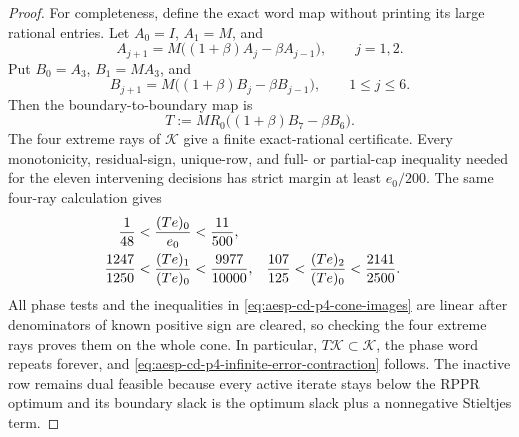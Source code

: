 \begin{proof}
For completeness, define the exact word map without printing its large
rational entries.  Let $A_0=I$, $A_1=M$, and
\begin{equation*}
 A_{j+1}=M\bigl((1+\beta)A_j-\beta A_{j-1}\bigr),
 \qquad j=1,2.
\end{equation*}
Put $B_0=A_3$, $B_1=MA_3$, and
\begin{equation*}
 B_{j+1}=M\bigl((1+\beta)B_j-\beta B_{j-1}\bigr),
 \qquad 1\leq j\leq6.
\end{equation*}
Then the boundary-to-boundary map is
\begin{equation}
 T:=MR_0\bigl((1+\beta)B_7-\beta B_6\bigr).
 \label{eq:aesp-cd-p4-word-map}
\end{equation}
The four extreme rays of $\mathcal K$ give a finite exact-rational
certificate.  Every monotonicity, residual-sign, unique-row, and full- or
partial-cap inequality needed for the eleven intervening decisions has
strict margin at least $e_0/200$.  The same four-ray calculation gives
\begin{align}
 \frac1{48}
 &<\frac{(Te)_0}{e_0}<\frac{11}{500},
 \notag\\
 \frac{1247}{1250}
 &<\frac{(Te)_1}{(Te)_0}<\frac{9977}{10000},
 &
 \frac{107}{125}
 &<\frac{(Te)_2}{(Te)_0}<\frac{2141}{2500}.
 \label{eq:aesp-cd-p4-cone-images}
\end{align}
All phase tests and the inequalities in
\cref{eq:aesp-cd-p4-cone-images} are linear after denominators of known
positive sign are cleared, so checking the four extreme rays proves them on
the whole cone.  In particular, $T\mathcal K\subset\mathcal K$, the phase
word repeats forever, and
\cref{eq:aesp-cd-p4-infinite-error-contraction} follows.  The inactive row
remains dual feasible because every active iterate stays below the RPPR
optimum and its boundary slack is the optimum slack plus a nonnegative
Stieltjes term.


\end{proof}
